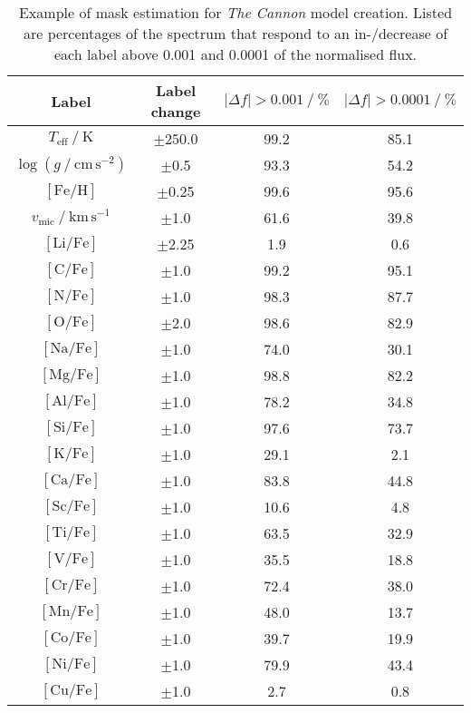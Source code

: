 \begin{table}
    \centering
    \caption{Example of mask estimation for \textit{The Cannon} model creation. Listed are percentages of the spectrum that respond to an in-/decrease of each label above 0.001 and 0.0001 of the normalised flux.}
    \label{tab:cannon_mask_percentage}
    \begin{tabular}{cccc}
    \hline \hline
    Label &  Label change & $\vert \Delta f \vert > 0.001~/~\%$ & $\vert \Delta f \vert > 0.0001~/~\%$ \\
    \hline
    $T_\mathrm{eff}~/~\mathrm{K}$ & $\pm$250.0 & 99.2 & 85.1 \\
    $\log (g~/~\mathrm{cm\,s^{-2}})$ & $\pm$0.5 & 93.3 & 54.2 \\
    $\mathrm{[Fe/H]}$ & $\pm$0.25 & 99.6 & 95.6 \\
    $v_\mathrm{mic}~/~\mathrm{km\,s^{-1}}$ & $\pm$1.0 & 61.6 & 39.8 \\
    $\mathrm{[Li/Fe]}$ & $\pm$2.25 & 1.9 & 0.6 \\
    $\mathrm{[C/Fe]}$ & $\pm$1.0 & 99.2 & 95.1 \\
    $\mathrm{[N/Fe]}$ & $\pm$1.0 & 98.3 & 87.7 \\
    $\mathrm{[O/Fe]}$ & $\pm$2.0 & 98.6 & 82.9 \\
    $\mathrm{[Na/Fe]}$ & $\pm$1.0 & 74.0 & 30.1 \\
    $\mathrm{[Mg/Fe]}$ & $\pm$1.0 & 98.8 & 82.2 \\
    $\mathrm{[Al/Fe]}$ & $\pm$1.0 & 78.2 & 34.8 \\
    $\mathrm{[Si/Fe]}$ & $\pm$1.0 & 97.6 & 73.7 \\
    $\mathrm{[K/Fe]}$ & $\pm$1.0 & 29.1 & 2.1 \\
    $\mathrm{[Ca/Fe]}$ & $\pm$1.0 & 83.8 & 44.8 \\
    $\mathrm{[Sc/Fe]}$ & $\pm$1.0 & 10.6 & 4.8 \\
    $\mathrm{[Ti/Fe]}$ & $\pm$1.0 & 63.5 & 32.9 \\
    $\mathrm{[V/Fe]}$ & $\pm$1.0 & 35.5 & 18.8 \\
    $\mathrm{[Cr/Fe]}$ & $\pm$1.0 & 72.4 & 38.0 \\
    $\mathrm{[Mn/Fe]}$ & $\pm$1.0 & 48.0 & 13.7 \\
    $\mathrm{[Co/Fe]}$ & $\pm$1.0 & 39.7 & 19.9 \\
    $\mathrm{[Ni/Fe]}$ & $\pm$1.0 & 79.9 & 43.4 \\
    $\mathrm{[Cu/Fe]}$ & $\pm$1.0 & 2.7 & 0.8 \\

\end{tabular}
\end{table}
